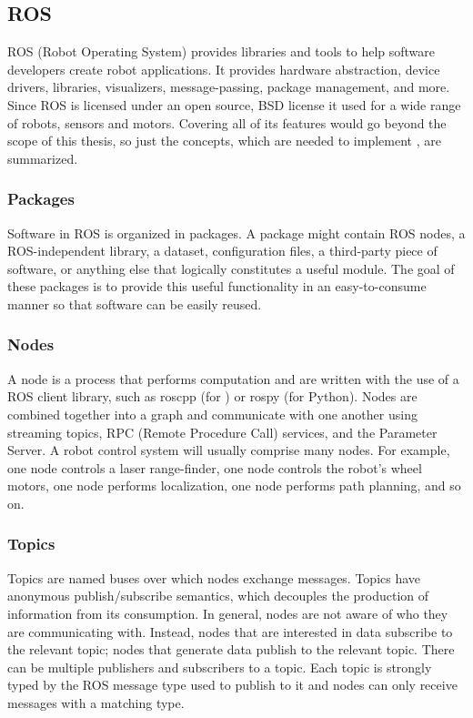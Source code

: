 \subsection{ROS} \label{sub:ros}
ROS (Robot Operating System) provides libraries and tools to help software developers create robot applications. It provides hardware abstraction, device drivers, libraries, visualizers, message-passing, package management, and more. Since ROS is licensed under an open source, BSD license it used for a wide range of robots, sensors and motors. Covering all of its features would go beyond the scope of this thesis, so just the concepts, which are needed to implement \toolname{}, are summarized. \cite{WikiROS}

\subsubsection{Packages}
Software in ROS is organized in packages. A package might contain ROS nodes, a ROS-independent library, a dataset, configuration files, a third-party piece of software, or anything else that logically constitutes a useful module. The goal of these packages is to provide this useful functionality in an easy-to-consume manner so that software can be easily reused.

\subsubsection{Nodes}
A node is a process that performs computation and are written with the use of a ROS client library, such as roscpp (for \Cpp{}) or rospy (for Python). Nodes are combined together into a graph and communicate with one another using streaming topics, RPC (Remote Procedure Call) services, and the Parameter Server. A robot control system will usually comprise many nodes. For example, one node controls a laser range-finder, one node controls the robot's wheel motors, one node performs localization, one node performs path planning, and so on.

\subsubsection{Topics}
Topics are named buses over which nodes exchange messages. Topics have anonymous publish/subscribe semantics, which decouples the production of information from its consumption. In general, nodes are not aware of who they are communicating with. Instead, nodes that are interested in data subscribe to the relevant topic; nodes that generate data publish to the relevant topic. There can be multiple publishers and subscribers to a topic. Each topic is strongly typed by the ROS message type used to publish to it and nodes can only receive messages with a matching type.

